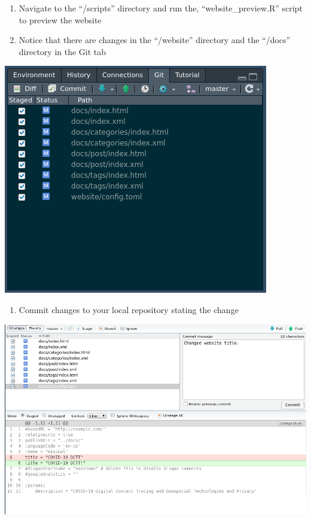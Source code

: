 \documentclass[
]{book}
\providecommand{\tightlist}{%
  \setlength{\itemsep}{0pt}\setlength{\parskip}{0pt}}
\begin{document}
\begin{enumerate}
\def\labelenumi{\arabic{enumi}.}
\setcounter{enumi}{3}
\tightlist
\item
  Navigate to the ``/scripts'' directory and run the, ``website\_preview.R'' script to preview the website
\item
  Notice that there are changes in the ``/website'' directory and the ``/docs'' directory in the Git tab
\end{enumerate}

\includegraphics{images/04-example1_2.png}

\begin{enumerate}
\def\labelenumi{\arabic{enumi}.}
\setcounter{enumi}{5}
\tightlist
\item
  Commit changes to your local repository stating the change
\end{enumerate}

\includegraphics{images/04-example1_3.png}
\end{document}
